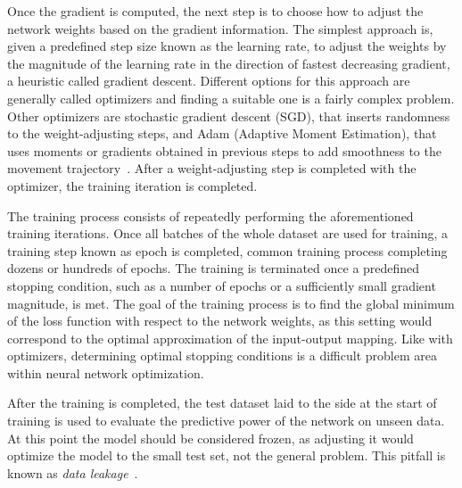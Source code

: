 \documentclass[english,twoside,openright]{UH_DS_MSc}
\begin{document}
Once the gradient is computed, the next step is to choose how to adjust the network weights 
based on the gradient information. The simplest approach is, given a predefined step size 
known as the learning rate, to adjust the weights by the magnitude of the learning rate 
in the direction of fastest decreasing gradient, a heuristic called gradient descent. Different options for this approach 
are generally called optimizers and finding a suitable one is a fairly complex problem.
Other optimizers are stochastic gradient descent (SGD), that inserts randomness 
to the weight-adjusting steps, and Adam (Adaptive Moment Estimation), that 
uses moments or gradients obtained in previous steps to add smoothness to the 
movement trajectory~\cite{princebook}. After a weight-adjusting step is completed 
with the optimizer, the training iteration is completed.

The training process consists of repeatedly performing the aforementioned training 
iterations. Once all batches of the whole dataset are used for training,
a training step known as epoch is completed, common training process 
completing dozens or hundreds of epochs. The training is terminated once a predefined 
stopping condition, such as a number of epochs or a sufficiently small gradient 
magnitude, is met. The goal of the training process is to find the global minimum of the loss 
function with respect to the network weights, as this setting would correspond to 
the optimal approximation of the input-output mapping. Like with optimizers, 
determining optimal stopping conditions is a difficult problem area within neural network optimization.

After the training is completed, the test dataset laid to the side at the start of 
training is used to evaluate the predictive power of the network on unseen data.
At this point the model should be considered frozen, as adjusting it would 
optimize the model to the small test set, not the general problem. This pitfall is 
known as \textit{data leakage}~\cite{engbook}.
\end{document}
